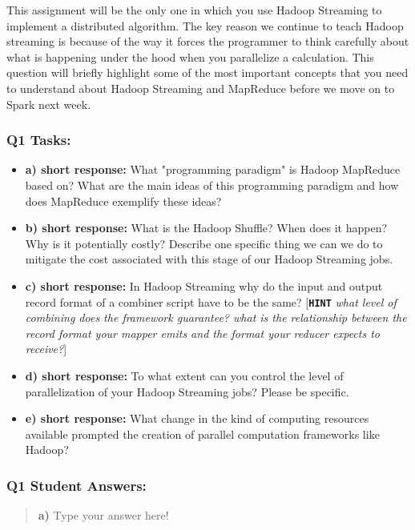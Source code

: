 \documentclass[11pt]{article}
\begin{document}
This assignment will be the only one in which you use Hadoop Streaming
to implement a distributed algorithm. The key reason we continue to
teach Hadoop streaming is because of the way it forces the programmer to
think carefully about what is happening under the hood when you
parallelize a calculation. This question will briefly highlight some of
the most important concepts that you need to understand about Hadoop
Streaming and MapReduce before we move on to Spark next week.

\subsubsection{Q1 Tasks:}\label{q1-tasks}

\begin{itemize}
\item
  \textbf{a) short response:} What "programming paradigm" is Hadoop
  MapReduce based on? What are the main ideas of this programming
  paradigm and how does MapReduce exemplify these ideas?
\item
  \textbf{b) short response:} What is the Hadoop Shuffle? When does it
  happen? Why is it potentially costly? Describe one specific thing we
  can we do to mitigate the cost associated with this stage of our
  Hadoop Streaming jobs.
\item
  \textbf{c) short response:} In Hadoop Streaming why do the input and
  output record format of a combiner script have to be the same?
  {[}\textbf{\texttt{HINT}} \emph{what level of combining does the
  framework guarantee? what is the relationship between the record
  format your mapper emits and the format your reducer expects to
  receive?}{]}
\item
  \textbf{d) short response:} To what extent can you control the level
  of parallelization of your Hadoop Streaming jobs? Please be specific.
\item
  \textbf{e) short response:} What change in the kind of computing
  resources available prompted the creation of parallel computation
  frameworks like Hadoop?
\end{itemize}

    \subsubsection{Q1 Student Answers:}\label{q1-student-answers}

\begin{quote}
\textbf{a)} Type your answer here!
\end{quote}
\end{document}
